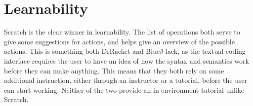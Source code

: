 \section{Learnability}
\label{sec:learnability}
Scratch is the clear winner in learnability.
The list of operations both serve to give some suggestions for actions, and helps give an overview of the possible actions.
This is something both DrRacket and BlueJ lack, as the textual coding interface requires the user to have an idea of how the syntax and semantics work before they can make anything.
This means that they both rely on some additional instruction, either through an instructor or a tutorial, before the user can start working.
Neither of the two provide an in-environment tutorial unlike Scratch.